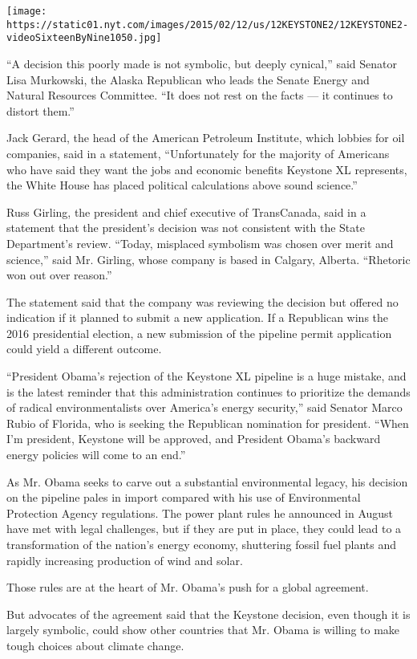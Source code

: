 \texttt{[image: https://static01.nyt.com/images/2015/02/12/us/12KEYSTONE2/12KEYSTONE2-videoSixteenByNine1050.jpg]}

``A decision this poorly made is not symbolic, but deeply cynical,''
said Senator Lisa Murkowski, the Alaska Republican who leads the Senate
Energy and Natural Resources Committee. ``It does not rest on the facts
--- it continues to distort them.''

Jack Gerard, the head of the American Petroleum Institute, which lobbies
for oil companies, said in a statement, ``Unfortunately for the majority
of Americans who have said they want the jobs and economic benefits
Keystone XL represents, the White House has placed political
calculations above sound science.''

Russ Girling, the president and chief executive of TransCanada, said in
a statement that the president's decision was not consistent with the
State Department's review. ``Today, misplaced symbolism was chosen over
merit and science,'' said Mr. Girling, whose company is based in
Calgary, Alberta. ``Rhetoric won out over reason.''

The statement said that the company was reviewing the decision but
offered no indication if it planned to submit a new application. If a
Republican wins the 2016 presidential election, a new submission of the
pipeline permit application could yield a different outcome.

``President Obama's rejection of the Keystone XL pipeline is a huge
mistake, and is the latest reminder that this administration continues
to prioritize the demands of radical environmentalists over America's
energy security,'' said Senator Marco Rubio of Florida, who is seeking
the Republican nomination for president. ``When I'm president, Keystone
will be approved, and President Obama's backward energy policies will
come to an end.''

As Mr. Obama seeks to carve out a substantial environmental legacy, his
decision on the pipeline pales in import compared with his use of
Environmental Protection Agency regulations. The power plant rules he
announced in August have met with legal challenges, but if they are put
in place, they could lead to a transformation of the nation's energy
economy, shuttering fossil fuel plants and rapidly increasing production
of wind and solar.

Those rules are at the heart of Mr. Obama's push for a global agreement.

But advocates of the agreement said that the Keystone decision, even
though it is largely symbolic, could show other countries that Mr. Obama
is willing to make tough choices about climate change.

